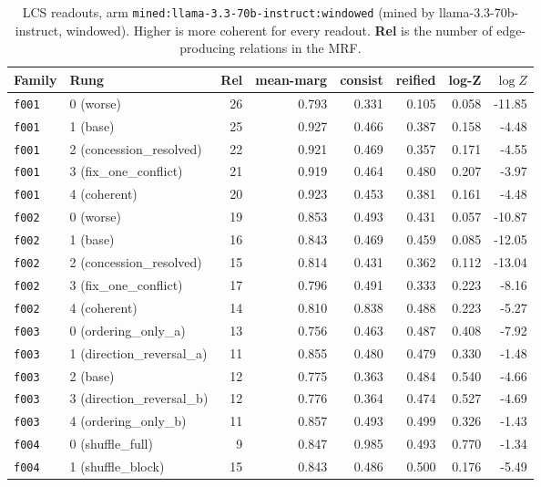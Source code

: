 \documentclass[11pt]{article}
\begin{document}
\begin{table}[htbp]
\centering
\small
\caption{LCS readouts, arm \texttt{mined:llama-3.3-70b-instruct:windowed} (mined by llama-3.3-70b-instruct, windowed). Higher is more coherent for every readout. \textbf{Rel} is the number of edge-producing relations in the MRF.}
\label{tab:scores-mined-llama-3-3-70b-instruct-windowed}
\begin{tabular}{llrrrrrr}
\toprule
Family & Rung & Rel & \textbf{mean-marg} & \textbf{consist} & \textbf{reified} & \textbf{log-Z} & $\log Z$ \\
\midrule
\texttt{f001} & 0 (worse) & 26 & 0.793 & 0.331 & 0.105 & 0.058 & -11.85 \\
\texttt{f001} & 1 (base) & 25 & 0.927 & 0.466 & 0.387 & 0.158 & -4.48 \\
\texttt{f001} & 2 (concession\_resolved) & 22 & 0.921 & 0.469 & 0.357 & 0.171 & -4.55 \\
\texttt{f001} & 3 (fix\_one\_conflict) & 21 & 0.919 & 0.464 & 0.480 & 0.207 & -3.97 \\
\texttt{f001} & 4 (coherent) & 20 & 0.923 & 0.453 & 0.381 & 0.161 & -4.48 \\
\midrule
\texttt{f002} & 0 (worse) & 19 & 0.853 & 0.493 & 0.431 & 0.057 & -10.87 \\
\texttt{f002} & 1 (base) & 16 & 0.843 & 0.469 & 0.459 & 0.085 & -12.05 \\
\texttt{f002} & 2 (concession\_resolved) & 15 & 0.814 & 0.431 & 0.362 & 0.112 & -13.04 \\
\texttt{f002} & 3 (fix\_one\_conflict) & 17 & 0.796 & 0.491 & 0.333 & 0.223 & -8.16 \\
\texttt{f002} & 4 (coherent) & 14 & 0.810 & 0.838 & 0.488 & 0.223 & -5.27 \\
\midrule
\texttt{f003} & 0 (ordering\_only\_a) & 13 & 0.756 & 0.463 & 0.487 & 0.408 & -7.92 \\
\texttt{f003} & 1 (direction\_reversal\_a) & 11 & 0.855 & 0.480 & 0.479 & 0.330 & -1.48 \\
\texttt{f003} & 2 (base) & 12 & 0.775 & 0.363 & 0.484 & 0.540 & -4.66 \\
\texttt{f003} & 3 (direction\_reversal\_b) & 12 & 0.776 & 0.364 & 0.474 & 0.527 & -4.69 \\
\texttt{f003} & 4 (ordering\_only\_b) & 11 & 0.857 & 0.493 & 0.499 & 0.326 & -1.43 \\
\midrule
\texttt{f004} & 0 (shuffle\_full) & 9 & 0.847 & 0.985 & 0.493 & 0.770 & -1.34 \\
\texttt{f004} & 1 (shuffle\_block) & 15 & 0.843 & 0.486 & 0.500 & 0.176 & -5.49 \\

\end{tabular}
\end{table}
\end{document}
